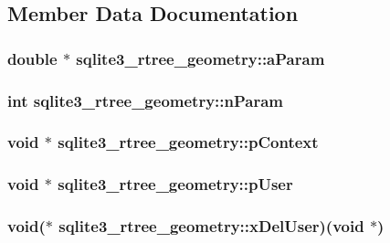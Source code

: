 \subsection{Member Data Documentation}
\hypertarget{structsqlite3__rtree__geometry_aa23f6565e6fee2416444333a75716057}{
\subsubsection[{a\-Param}]{\setlength{\rightskip}{0pt plus 5cm}double $\ast$ sqlite3\-\_\-rtree\-\_\-geometry\-::a\-Param}}\label{structsqlite3__rtree__geometry_aa23f6565e6fee2416444333a75716057}
\hypertarget{structsqlite3__rtree__geometry_ada7b9eba82660e3321dd4c93526697c9}{
\subsubsection[{n\-Param}]{\setlength{\rightskip}{0pt plus 5cm}int sqlite3\-\_\-rtree\-\_\-geometry\-::n\-Param}}\label{structsqlite3__rtree__geometry_ada7b9eba82660e3321dd4c93526697c9}
\hypertarget{structsqlite3__rtree__geometry_a33f98691626846c1317419654d5c5f51}{
\subsubsection[{p\-Context}]{\setlength{\rightskip}{0pt plus 5cm}void $\ast$ sqlite3\-\_\-rtree\-\_\-geometry\-::p\-Context}}\label{structsqlite3__rtree__geometry_a33f98691626846c1317419654d5c5f51}
\hypertarget{structsqlite3__rtree__geometry_a6fdedfd741cf5055f9562298cd32dc74}{
\subsubsection[{p\-User}]{\setlength{\rightskip}{0pt plus 5cm}void $\ast$ sqlite3\-\_\-rtree\-\_\-geometry\-::p\-User}}\label{structsqlite3__rtree__geometry_a6fdedfd741cf5055f9562298cd32dc74}
\hypertarget{structsqlite3__rtree__geometry_afa1ed10f488b306df354efe56efdf287}{
\subsubsection[{x\-Del\-User}]{\setlength{\rightskip}{0pt plus 5cm}void($\ast$ sqlite3\-\_\-rtree\-\_\-geometry\-::x\-Del\-User)(void $\ast$)}}\label{structsqlite3__rtree__geometry_afa1ed10f488b306df354efe56efdf287}


